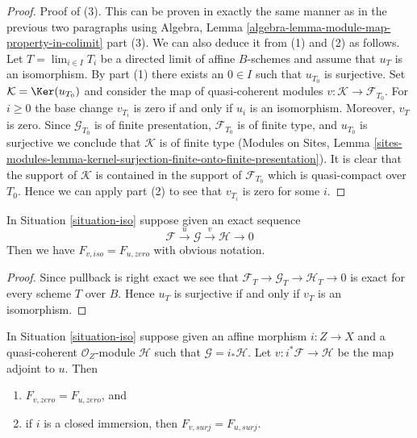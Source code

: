 \begin{proof}
\medskip\noindent
Proof of (3). This can be proven in exactly the same manner as in the
previous two paragraphs using
Algebra, Lemma \ref{algebra-lemma-module-map-property-in-colimit} part (3).
We can also deduce it from (1) and (2) as follows.
Let $T = \lim_{i \in I} T_i$ be a directed limit of affine $B$-schemes
and assume that $u_T$ is an isomorphism. By part (1) there exists
an $0 \in I$ such that $u_{T_0}$ is surjective. Set
$\mathcal{K} = \Ker(u_{T_0})$ and consider the map of quasi-coherent
modules $v : \mathcal{K} \to \mathcal{F}_{T_0}$. For $i \geq 0$ the base
change $v_{T_i}$ is zero if and only if $u_i$ is an isomorphism. Moreover,
$v_T$ is zero. Since $\mathcal{G}_{T_0}$
is of finite presentation, $\mathcal{F}_{T_0}$ is of finite type, and
$u_{T_0}$ is surjective we conclude that $\mathcal{K}$ is of finite type
(Modules on Sites, Lemma
\ref{sites-modules-lemma-kernel-surjection-finite-onto-finite-presentation}).
It is clear that the support of $\mathcal{K}$ is contained in the
support of $\mathcal{F}_{T_0}$ which is quasi-compact over $T_0$.
Hence we can apply part (2) to see that $v_{T_i}$ is zero for some $i$.
\end{proof}

\begin{lemma}
\label{lemma-relate-zero-iso}
In Situation \ref{situation-iso} suppose given an exact sequence
$$
\mathcal{F} \xrightarrow{u} \mathcal{G} \xrightarrow{v} \mathcal{H} \to 0
$$
Then we have $F_{v, iso} = F_{u, zero}$ with obvious notation.
\end{lemma}

\begin{proof}
Since pullback is right exact we see that
$\mathcal{F}_T \to \mathcal{G}_T \to \mathcal{H}_T \to 0$
is exact for every scheme $T$ over $B$. Hence $u_T$ is
surjective if and only if $v_T$ is an isomorphism.
\end{proof}

\begin{lemma}
\label{lemma-relate-zero-affine}
In Situation \ref{situation-iso} suppose given an affine morphism
$i : Z \to X$ and a quasi-coherent $\mathcal{O}_Z$-module $\mathcal{H}$
such that $\mathcal{G} = i_*\mathcal{H}$. Let
$v : i^*\mathcal{F} \to \mathcal{H}$ be the map adjoint to $u$.
Then
\begin{enumerate}
\item $F_{v, zero} = F_{u, zero}$, and
\item if $i$ is a closed immersion, then $F_{v, surj} = F_{u, surj}$.
\end{enumerate}
\end{lemma}

